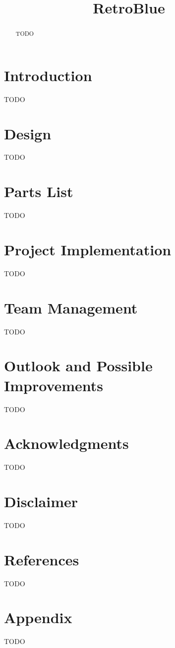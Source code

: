 \documentclass{es50report}
\title{RetroBlue}
\begin{document}
    \maketitlepage

    \begin{abstract}
        TODO
    \end{abstract}
    \newpage

    \section{Introduction}
    TODO

    \section{Design}
    TODO

    \section{Parts List}
    TODO

    \section{Project Implementation}
    TODO

    \section{Team Management}
    TODO

    \section{Outlook and Possible Improvements}
    TODO

    \section{Acknowledgments}
    TODO

    \section{Disclaimer}
    TODO

    \section{References}
    TODO

    \appendix
    \section{Appendix}
    TODO
\end{document}
